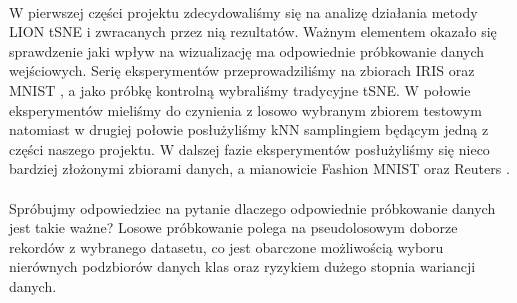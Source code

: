 \documentclass{article}
\begin{document}
\paragraph{}
W pierwszej części projektu zdecydowaliśmy się na analizę działania metody LION tSNE i
zwracanych przez nią rezultatów. Ważnym elementem okazało się sprawdzenie
jaki wpływ na wizualizację ma odpowiednie próbkowanie danych wejściowych. Serię
eksperymentów przeprowadziliśmy na zbiorach IRIS \cite{iris-dataset} oraz MNIST \cite{mnist-dataset}, a jako próbkę kontrolną
wybraliśmy tradycyjne tSNE. W połowie eksperymentów mieliśmy do czynienia z losowo
wybranym zbiorem testowym natomiast w drugiej połowie posłużyliśmy kNN
samplingiem będącym jedną z części naszego projektu. W dalszej fazie eksperymentów posłużyliśmy się nieco bardziej złożonymi zbiorami danych, a mianowicie Fashion MNIST \cite{fmnist-dataset} oraz Reuters  \cite{reuters-dataset}. 

\paragraph{}
Spróbujmy odpowiedziec na pytanie dlaczego odpowiednie próbkowanie danych jest takie ważne?
Losowe próbkowanie polega na pseudolosowym doborze rekordów z wybranego
datasetu, co jest obarczone możliwością wyboru nierównych podzbiorów danych klas oraz
ryzykiem dużego stopnia wariancji danych.
\end{document}
